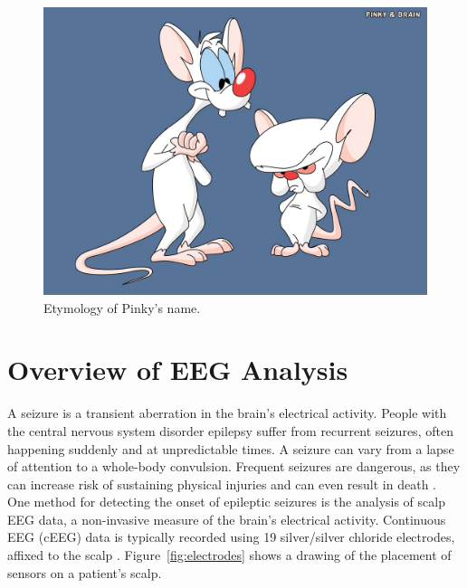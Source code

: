 \begin{figure}[h]
\begin{center}
\includegraphics[scale=0.5]{./img/pinky-and-the-brain.png}
\caption{Etymology of Pinky's name.}
\label{fig:pinky-and-the-brain}
\end{center}
\end{figure}

\section{Overview of EEG Analysis}\label{intro-ch:eeg-overview}

A seizure is a transient aberration in the brain's electrical activity. People
with the central nervous system disorder epilepsy suffer from recurrent
seizures, often happening suddenly and at unpredictable times. A seizure can
vary from a lapse of attention to a whole-body convulsion. Frequent seizures
are dangerous, as they can increase risk of sustaining physical injuries and
can even result in death \cite{eeg-ml}. \\

One method for detecting the onset of epileptic seizures is the analysis of
scalp EEG data, a non-invasive measure of the brain's electrical activity.
Continuous EEG (cEEG) data is typically recorded using 19 silver/silver
chloride electrodes, affixed to the scalp \cite{ceeg-1}.
Figure~\ref{fig:electrodes} shows a drawing of the placement of sensors on a
patient's scalp. \\

